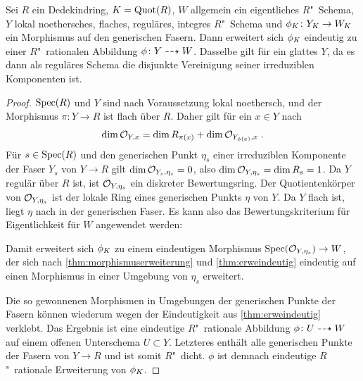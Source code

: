 \begin{Lemma}\label{thm:erwrrational}
  Sei $R$ ein Dedekindring, $K=\operatorname{Quot}(R)$, $W$ allgemein ein
  eigentliches $R$"~Schema, $Y$ lokal noethersches, flaches, reguläres,
  integres
  $R$"~Schema und ${\phi_{K}\colon Y_{K}\to W_{K}}$ ein Morphismus auf den
  generischen Fasern.
  Dann erweitert sich $\phi_{K}$ eindeutig zu einer
  $R$"~rationalen Abbildung ${\phi\colon Y\dashrightarrow W}$.
  Dasselbe gilt für ein glattes $Y$, da es dann als reguläres Schema
  die disjunkte Vereinigung seiner irreduziblen Komponenten ist.
  \begin{proof}
    $\operatorname{Spec}(R)$ und $Y$ sind nach Voraussetzung lokal noethersch,
    und der Morphismus ${\pi\colon Y\to R}$ ist flach über $R$. Daher
    gilt für ein $x\in Y$ nach \cite[Theorem~4.3.12]{liu}
    \begin{gather}\label{eq:stalkdimension}
      \dim\mathcal{O}_{Y,x} = \dim R_{\pi(x)} + \dim\mathcal{O}_{Y_{\phi(x)}, x}\;.
    \end{gather}
    Für $s\in\operatorname{Spec}(R)$ und den generischen Punkt $\eta_{s}$ einer
    irreduziblen Komponente der Faser $Y_s$ von $Y\to R$ gilt
    $\dim\mathcal{O}_{Y_s, \eta_{s}}=0$, also $\dim\mathcal{O}_{Y,\eta_{s}}=\dim R_s=1$.
    Da $Y$ regulär über $R$ ist, ist $\mathcal{O}_{Y,\eta_{s}}$ ein diskreter
    Bewertungsring.
    Der Quotientenkörper von $\mathcal{O}_{Y,\eta_{s}}$ ist der lokale Ring
    eines generischen Punkts $\eta$ von $Y$. Da $Y$ flach
    ist, liegt $\eta$ nach \cite[Proposition~III.9.7]{hartshorne} in
    der generischen Faser.
    Es kann also das Bewertungskriterium für Eigentlichkeit für $W$
    angewendet werden:
    \begin{center}
    \end{center}
    Damit erweitert sich $\phi_{K}$ zu einem eindeutigen Morphismus
    ${\operatorname{Spec}(\mathcal{O}_{Y,\eta_{s}})\to W}$, der sich nach
    \ref{thm:morphismuserweiterung} und \ref{thm:erweindeutig}
    eindeutig auf einen Morphismus in einer Umgebung von $\eta_{s}$
    erweitert.
    
    Die so gewonnenen Morphismen in Umgebungen der generischen Punkte
    der Fasern können wiederum wegen der Eindeutigkeit aus
    \ref{thm:erweindeutig} verklebt. Das Ergebnis ist eine eindeutige
    $R$"~rationale Abbildung $\phi\colon U\dashrightarrow W$ auf einem offenen
    Unterschema $U\subset Y$.
    Letzteres enthält alle generischen Punkte der Fasern von $Y\to R$
    und ist somit $R$"~dicht.
    $\phi$ ist demnach eindeutige $R$"~rationale Erweiterung von
    $\phi_{K}$.
  \end{proof}
\end{Lemma}
